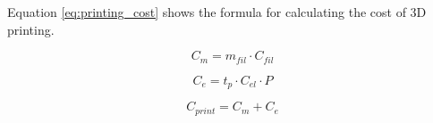Equation \ref{eq:printing_cost} shows the formula for calculating the cost of 3D printing.

\begin{equation}
  \label{eq:material_cost}
  C_{m} = m_{fil}\cdot C_{fil}
\end{equation}

\begin{equation}
  \label{eq:energy_cost}
  C_{e} = t_{p}\cdot C_{el}\cdot P
\end{equation}

\begin{equation}
  \label{eq:printing_cost}
  C_{print} = C_{m} + C_{e}
\end{equation}



